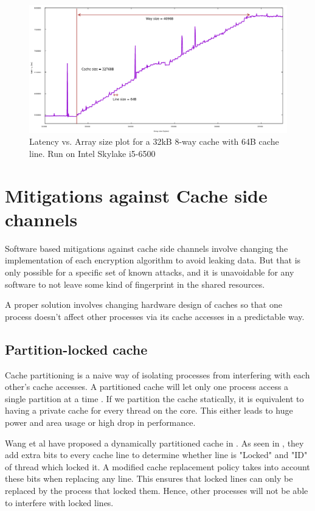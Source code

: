 \begin{figure}[h]
\centering
\includegraphics[width=\textwidth]{reverse_eng_32kb}
\caption[1KB cache stride access]{Latency vs. Array size plot for a 32kB 8-way cache with 64B cache line. Run on Intel Skylake i5-6500}
\label{fig:x86_cache}
\end{figure}

\chapter{Mitigations against Cache side channels}

Software based mitigations against cache side channels involve changing the
implementation of each encryption algorithm to avoid leaking data. But that is only
possible for a specific set of known attacks, and it is unavoidable for any software
to not leave some kind of fingerprint in the shared resources.

A proper solution involves changing hardware design of caches so that one process
doesn't affect other processes via its cache accesses in a predictable way.

\section{Partition-locked cache}

Cache partitioning is a naive way of isolating processes from interfering with each other's cache accesses.
A partitioned cache will let only one process access a single partition at a time . If we partition
the cache statically, it is equivalent to having a private cache for every thread on the core.
This either leads to huge power and area usage or high drop in performance.

Wang et al have proposed a dynamically partitioned cache in . As seen in ,
they add extra bits to every cache line to determine whether line is "Locked" and "ID" of thread which locked it.
A modified cache replacement policy takes into account these bits when replacing any line. This ensures that
locked lines can only be replaced by the process that locked them. Hence, other processes will not be able
to interfere with locked lines.

